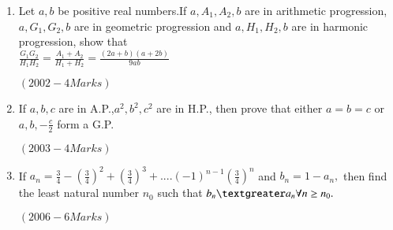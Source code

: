 \documentclass[journal,12pt,twocolumn]{IEEEtran}
\theoremstyle{remark}
\begin{document}
\begin{enumerate}
       \item Let $a,b$ be positive real numbers.If $ a,A_{1},A_{2},b $ are in arithmetic progression, $ a,G_{1},G_{2},b $ are in geometric progression and $ a,H_{1},H_{2},b $ are in harmonic progression, show that \\ 
	       $ \frac{G_{1}G_{2}}{H_{1}H_{2}}=\frac{A_{1}+A_{2}}{H_{1}+H_{2}}=\frac{(2a+b)(a+2b)}{9ab} $ 

\hfill$(2002 -4 Marks)$                             
     
	\item If $a,b,c$ are in A.P.,$a^{2},b^{2},c^{2} $ are in H.P., then prove that either $ a=b=c $ or $a,b,-\frac{c}{2}$ form a G.P. 
		                    
                      \hfill$(2003 -4 Marks)$                             

		\item If $ a_n=\frac{3}{4}-(\frac{3}{4})^{2}+(\frac{3}{4})^{3}+....(-1)^{n-1}(\frac{3}{4})^{n} $ and $ b_{n}=1-a_{n}, $ then find the least natural number $n_{0}$ such that $ b_{n} \textgreater a_{n} \forall n \geq n_{0}. $ 
		             
                             \hfill$(2006 -6 Marks)$                              
 \end{enumerate} 
\end{document}
